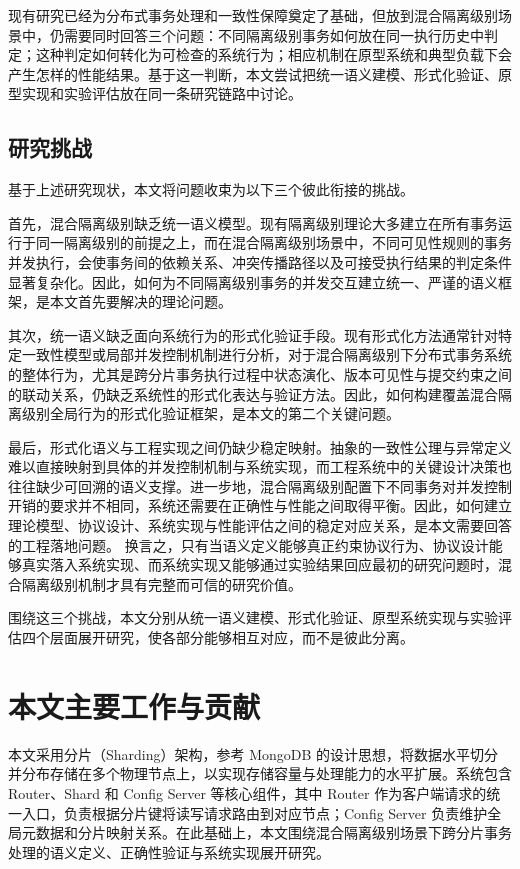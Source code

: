 现有研究已经为分布式事务处理和一致性保障奠定了基础，但放到混合隔离级别场景中，仍需要同时回答三个问题：不同隔离级别事务如何放在同一执行历史中判定；这种判定如何转化为可检查的系统行为；相应机制在原型系统和典型负载下会产生怎样的性能结果。基于这一判断，本文尝试把统一语义建模、形式化验证、原型实现和实验评估放在同一条研究链路中讨论。

\subsection{研究挑战}

基于上述研究现状，本文将问题收束为以下三个彼此衔接的挑战。

首先，混合隔离级别缺乏统一语义模型。现有隔离级别理论大多建立在所有事务运行于同一隔离级别的前提之上，而在混合隔离级别场景中，不同可见性规则的事务并发执行，会使事务间的依赖关系、冲突传播路径以及可接受执行结果的判定条件显著复杂化。因此，如何为不同隔离级别事务的并发交互建立统一、严谨的语义框架，是本文首先要解决的理论问题。

其次，统一语义缺乏面向系统行为的形式化验证手段。现有形式化方法通常针对特定一致性模型或局部并发控制机制进行分析，对于混合隔离级别下分布式事务系统的整体行为，尤其是跨分片事务执行过程中状态演化、版本可见性与提交约束之间的联动关系，仍缺乏系统性的形式化表达与验证方法。因此，如何构建覆盖混合隔离级别全局行为的形式化验证框架，是本文的第二个关键问题。

最后，形式化语义与工程实现之间仍缺少稳定映射。抽象的一致性公理与异常定义难以直接映射到具体的并发控制机制与系统实现，而工程系统中的关键设计决策也往往缺少可回溯的语义支撑。进一步地，混合隔离级别配置下不同事务对并发控制开销的要求并不相同，系统还需要在正确性与性能之间取得平衡。因此，如何建立理论模型、协议设计、系统实现与性能评估之间的稳定对应关系，是本文需要回答的工程落地问题。
换言之，只有当语义定义能够真正约束协议行为、协议设计能够真实落入系统实现、而系统实现又能够通过实验结果回应最初的研究问题时，混合隔离级别机制才具有完整而可信的研究价值。

围绕这三个挑战，本文分别从统一语义建模、形式化验证、原型系统实现与实验评估四个层面展开研究，使各部分能够相互对应，而不是彼此分离。

\section{本文主要工作与贡献}

本文采用分片（Sharding）架构\cite{thomson2012calvin}，参考 MongoDB 的设计思想，将数据水平切分并分布存储在多个物理节点上，以实现存储容量与处理能力的水平扩展。系统包含 Router、Shard 和 Config Server 等核心组件，其中 Router 作为客户端请求的统一入口，负责根据分片键将读写请求路由到对应节点；Config Server 负责维护全局元数据和分片映射关系。在此基础上，本文围绕混合隔离级别场景下跨分片事务处理的语义定义、正确性验证与系统实现展开研究。

